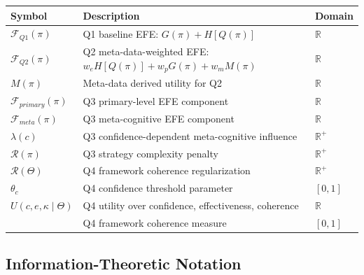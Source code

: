 \documentclass[
]{article}
\newcounter{none} %
\begin{document}
{\def\LTcaptype{none} %
\begin{longtable}[]{@{}
  >{\raggedright\arraybackslash}p{}
  >{\raggedright\arraybackslash}p{}
  >{\raggedright\arraybackslash}p{}@{}}
\toprule\noalign{}
\begin{minipage}[b]{\linewidth}\raggedright
Symbol
\end{minipage} & \begin{minipage}[b]{\linewidth}\raggedright
Description
\end{minipage} & \begin{minipage}[b]{\linewidth}\raggedright
Domain
\end{minipage} \\
\midrule\noalign{}
\endhead
\bottomrule\noalign{}
\endlastfoot
\(\mathcal{F}_{Q1}(\pi)\) & Q1 baseline EFE: \(G(\pi) + H[Q(\pi)]\) &
\(\mathbb{R}\) \\
\(\mathcal{F}_{Q2}(\pi)\) & Q2 meta-data-weighted EFE:
\(w_e H[Q(\pi)] + w_p G(\pi) + w_m M(\pi)\) & \(\mathbb{R}\) \\
\(M(\pi)\) & Meta-data derived utility for Q2 & \(\mathbb{R}\) \\
\(\mathcal{F}_{primary}(\pi)\) & Q3 primary-level EFE component &
\(\mathbb{R}\) \\
\(\mathcal{F}_{meta}(\pi)\) & Q3 meta-cognitive EFE component &
\(\mathbb{R}\) \\
\(\lambda(c)\) & Q3 confidence-dependent meta-cognitive influence &
\(\mathbb{R}^+\) \\
\(\mathcal{R}(\pi)\) & Q3 strategy complexity penalty &
\(\mathbb{R}^+\) \\
\(\mathcal{R}(\Theta)\) & Q4 framework coherence regularization &
\(\mathbb{R}^+\) \\
\(\theta_c\) & Q4 confidence threshold parameter & \([0,1]\) \\
\(U(c, e, \kappa \mid \Theta)\) & Q4 utility over confidence,
effectiveness, coherence & \(\mathbb{R}\) \\
\(\kappa) & Q4 framework coherence measure & \([0,1]\) \\
\end{longtable}
}

\subsection{Information-Theoretic
Notation}\label{information-theoretic-notation}
\end{document}
